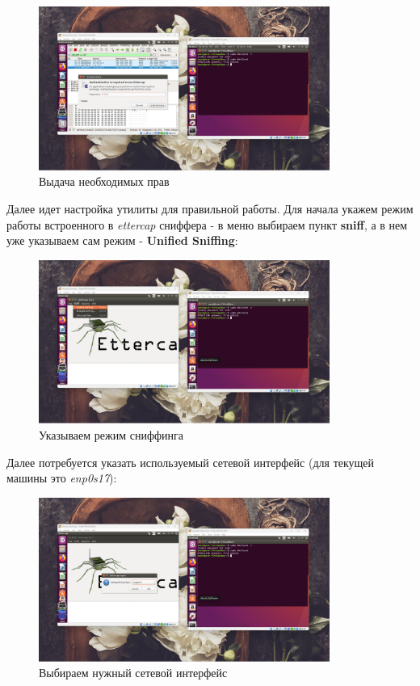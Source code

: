 \documentclass[a4paper]{article}
\begin{document}
  \begin{figure}[H]
    \centering
    \includegraphics[width=0.85\textwidth]{02_00 (24)}
    \caption{Выдача необходимых прав}
    \label{img:0020}
  \end{figure}

  Далее идет настройка утилиты для правильной работы. Для начала укажем режим работы встроенного
  в \textit{ettercap} сниффера - в меню выбираем пункт \textbf{sniff}, а в нем уже указываем
  сам режим - \textbf{Unified Sniffing}:

  \begin{figure}[H]
    \centering
    \includegraphics[width=0.85\textwidth]{02_00 (25)}
    \caption{Указываем режим сниффинга}
    \label{img:0021}
  \end{figure}

  Далее потребуется указать используемый сетевой интерфейс (для текущей машины это \textit{enp0s17}):

  \begin{figure}[H]
    \centering
    \includegraphics[width=0.85\textwidth]{02_00 (26)}
    \caption{Выбираем нужный сетевой интерфейс}
    \label{img:0022}
  \end{figure}
\end{document}
